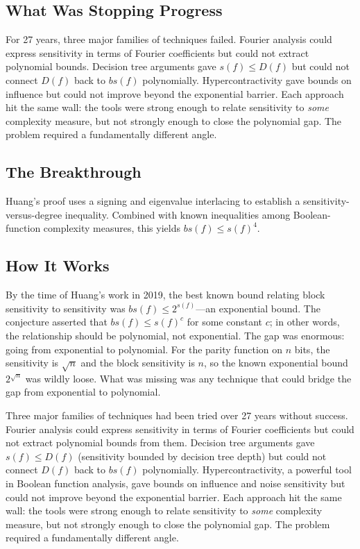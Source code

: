 \subsection{What Was Stopping Progress}
For 27 years, three major families of techniques failed. Fourier analysis could express sensitivity in terms of Fourier coefficients but could not extract polynomial bounds. Decision tree arguments gave $s(f) \leq D(f)$ but could not connect $D(f)$ back to $bs(f)$ polynomially. Hypercontractivity gave bounds on influence but could not improve beyond the exponential barrier. Each approach hit the same wall: the tools were strong enough to relate sensitivity to \emph{some} complexity measure, but not strongly enough to close the polynomial gap. The problem required a fundamentally different angle.

\subsection{The Breakthrough}
Huang's proof uses a signing and eigenvalue interlacing to establish a sensitivity-versus-degree inequality. Combined with known inequalities among Boolean-function complexity measures, this yields $bs(f)\leq s(f)^4$.

\subsection{How It Works}

By the time of Huang's work in 2019, the best known bound relating block sensitivity to sensitivity was $bs(f) \leq 2^{s(f)}$---an exponential bound. The conjecture asserted that $bs(f) \leq s(f)^c$ for some constant $c$; in other words, the relationship should be polynomial, not exponential. The gap was enormous: going from exponential to polynomial. For the parity function on $n$ bits, the sensitivity is $\sqrt{n}$ and the block sensitivity is $n$, so the known exponential bound $2^{\sqrt{n}}$ was wildly loose. What was missing was any technique that could bridge the gap from exponential to polynomial.

Three major families of techniques had been tried over 27 years without success. Fourier analysis could express sensitivity in terms of Fourier coefficients but could not extract polynomial bounds from them. Decision tree arguments gave $s(f) \leq D(f)$ (sensitivity bounded by decision tree depth) but could not connect $D(f)$ back to $bs(f)$ polynomially. Hypercontractivity, a powerful tool in Boolean function analysis, gave bounds on influence and noise sensitivity but could not improve beyond the exponential barrier. Each approach hit the same wall: the tools were strong enough to relate sensitivity to \emph{some} complexity measure, but not strongly enough to close the polynomial gap. The problem required a fundamentally different angle.

